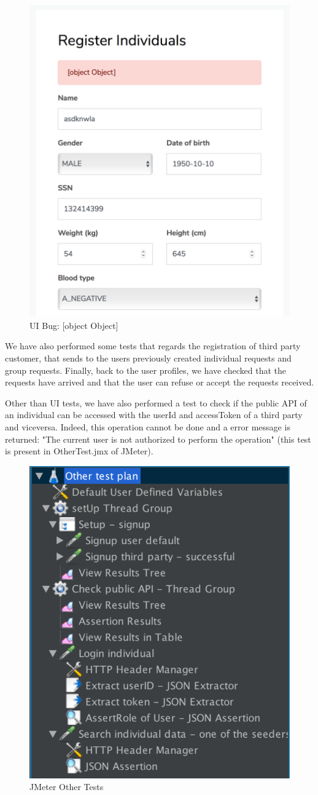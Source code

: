 \begin{figure}[H]
\includegraphics[width=0.7\linewidth]{images/objectError}
\centering
\caption{ UI Bug: [object Object] }
\label{fig:bugobject}
\end{figure}

We have also performed some tests that regards the registration of third party customer, that sends to the users previously
created individual requests and group requests. Finally, back to the user profiles, we have checked that the requests have arrived and that
the user can refuse or accept the requests received.\\

\par
Other than UI tests, we have also performed a test to check if the public API of an individual can be accessed with the userId and accessToken of a third party and viceversa. Indeed, this operation cannot be done and a error message is returned: "The current user is not authorized to perform the operation" (this test is present in OtherTest.jmx of JMeter).

\begin{figure}[H]
\includegraphics[width=0.7\linewidth]{images/otherTest}
\centering
\caption{ JMeter Other Tests }
\label{fig:othertest}
\end{figure}
